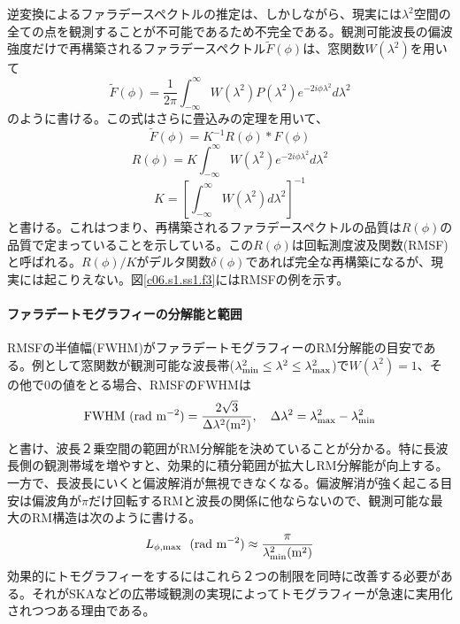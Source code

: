 逆変換によるファラデースペクトルの推定は、しかしながら、現実には$\lambda^2$空間の全ての点を観測することが不可能であるため不完全である。観測可能波長の偏波強度だけで再構築されるファラデースペクトル$\tilde F(\phi)$は、窓関数$W(\lambda^2)$を用いて
\begin{equation}
\tilde F(\phi)=\frac{1}{2\pi}\int_{-\infty}^\infty W(\lambda^2)P(\lambda^2)e^{-2i\phi\lambda^2}d\lambda^2
\end{equation}
のように書ける。この式はさらに畳込みの定理を用いて、
\begin{equation}
\tilde F(\phi)=K^{-1}R(\phi)\ast F(\phi)
\end{equation}
\begin{equation}
R(\phi)=K\int^\infty_{-\infty} W(\lambda^2)e^{-2i\phi\lambda^2}d\lambda^2
\end{equation}
\begin{equation}
K=\left[\int^\infty_{-\infty} W(\lambda^2)d\lambda^2\right]^{-1}
\end{equation}
と書ける。これはつまり、再構築されるファラデースペクトルの品質は$R(\phi)$の品質で定まっていることを示している。この$R(\phi)$は回転測度波及関数(RMSF)と呼ばれる。$R(\phi)/K$がデルタ関数$\delta(\phi)$であれば完全な再構築になるが、現実には起こりえない。図\ref{c06.s1.ss1.f3}にはRMSFの例を示す。

\paragraph{ファラデートモグラフィーの分解能と範囲}

RMSFの半値幅(FWHM)がファラデートモグラフィーのRM分解能の目安である。例として窓関数が観測可能な波長帯($\lambda^2_{\rm min} \leq \lambda^2\leq \lambda^2_{\rm max}$)で$W(\lambda^2)=1$、その他で0の値をとる場合、RMSFのFWHMは
\begin{equation}
{\rm FWHM~(rad~m^{-2})} = \frac{2\sqrt3}{\Delta\lambda^2({\rm m^2})},
\quad \Delta\lambda^2 = \lambda^2_{\rm max} - \lambda^2_{\rm min}
\end{equation}
と書け、波長２乗空間の範囲がRM分解能を決めていることが分かる。特に長波長側の観測帯域を増やすと、効果的に積分範囲が拡大しRM分解能が向上する。一方で、長波長にいくと偏波解消が無視できなくなる。偏波解消が強く起こる目安は偏波角が$\pi$だけ回転するRMと波長の関係に他ならないので、観測可能な最大のRM構造は次のように書ける。
\begin{equation}
L_{\rm \phi, max}~{\rm~(rad~m^{-2})} \approx \frac{\pi}{\lambda^2_{\rm min}({\rm m^2})}
\end{equation}
効果的にトモグラフィーをするにはこれら２つの制限を同時に改善する必要がある。それがSKAなどの広帯域観測の実現によってトモグラフィーが急速に実用化されつつある理由である。

